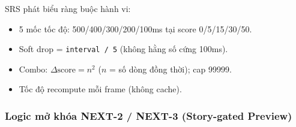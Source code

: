 \documentclass[12pt,a4paper]{article}
\begin{document}
SRS phát biểu ràng buộc hành vi:
\begin{itemize}[nosep]
  \item 5 mốc tốc độ: 500/400/300/200/100ms tại score 0/5/15/30/50.
  \item Soft drop = \texttt{interval / 5} (không hằng số cứng 100ms).
  \item Combo: $\Delta\text{score} = n^2$ ($n$ = số dòng đồng thời); cap 99999.
  \item Tốc độ recompute mỗi frame (không cache).
\end{itemize}

\subsubsection{Logic mở khóa NEXT-2 / NEXT-3 (Story-gated Preview)}
\end{document}
